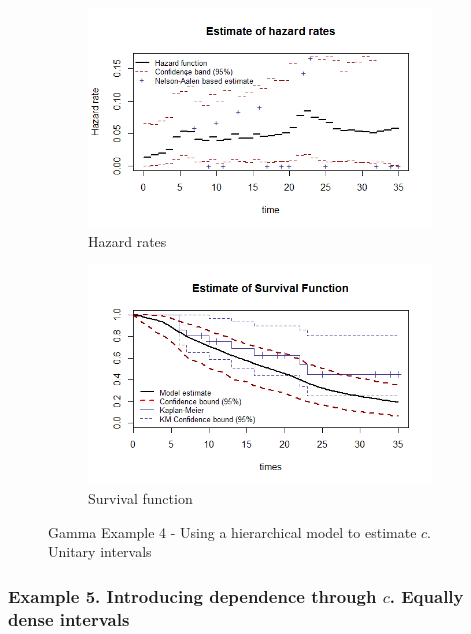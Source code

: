 \documentclass[letterpaper]{article}\usepackage[]{graphicx}\usepackage[]{color}
\begin{document}
\begin{figure}
  \centering
  \begin{subfigure}[a]{\textwidth}\centering
    \includegraphics[width=\textwidth]{G41.png}
    \caption{Hazard rates}
  \end{subfigure}
  \begin{subfigure}[b]{\textwidth}\centering
    \includegraphics[width=\textwidth]{G42.png}
    \caption{Survival function}
  \end{subfigure}
  \caption{Gamma Example 4 - Using a hierarchical model to estimate $c$. Unitary intervals}
  \label{fig:G4}
\end{figure}

\subsubsection{Example 5. Introducing dependence through $c$. Equally dense intervals}
\end{document}
